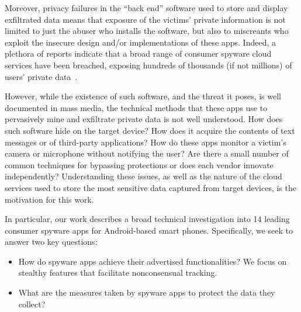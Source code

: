 Moreover, privacy failures in the ``back end'' software used to store and
display exfiltrated data means that exposure of the victims' private information is not limited to just the abuser who installs the software, but also to miscreants who exploit the insecure design and/or implementations of these apps.
Indeed, a plethora of reports indicate that a broad range of consumer spyware cloud services have been breached,
exposing hundreds of thousands (if not millions) of users' private data~\cite{HackerSt66:online,Companyt8:online,mSpybrea38:online,mSpyCybe86:online,Cerberus12:online,Stalkerw59:online,HackerSt50:online,Spywaref13:online,RetinaXa98:online,Hackercl62:online}.

However, while the existence of such software, and the threat it poses,
is well documented in mass media, the technical methods that these apps use to pervasively mine and exfiltrate private data is not well understood.
How does such software hide on
the target device?  How does it acquire the contents of text messages
or of third-party applications? How do these apps monitor a victim's camera or microphone without notifying the user?  Are there a small number of
common techniques for bypassing protections or does each vendor
innovate independently?  Understanding these issues, as well as the
nature of the cloud services used to store the most sensitive data
captured from target devices, is the motivation for this work.

In particular, our work describes a broad technical investigation
into 14 leading consumer spyware apps for Android-based smart
phones.
Specifically, we seek to answer two key questions:
\begin{itemize}
    \item How do spyware apps achieve their advertised functionalities? We focus on stealthy features that facilitate nonconsensual tracking.
    \item What are the measures taken by spyware apps to protect the data they collect?
\end{itemize}


